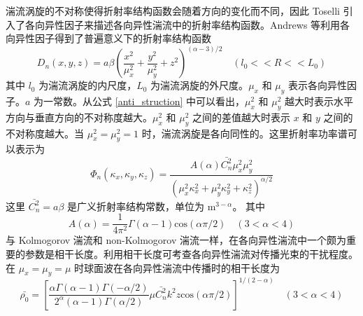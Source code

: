 \documentclass[master]{thesis-uestc}
\begin{document}
湍流涡旋的不对称使得折射率结构函数会随着方向的变化而不同，因此 Toselli 引入了各向异性因子来描述各向异性湍流中的折射率结构函数。Andrews 等利用各向异性因子得到了普遍意义下的折射率结构函数
\begin{equation}\label{anti_struction}
D_n(x,y,z)=a\beta\left(\frac{x^2}{\mu^2_x}+\frac{y^2}{\mu^2_y}+z^2\right)^{(\alpha-3)/2}\quad(l_{0}<<R<<L_0)
\end{equation}
\noindent 其中 $l_{0}$ 为湍流涡旋的内尺度，$L_{0}$ 为湍流涡旋的外尺度。$\mu_x$ 和 $\mu_y$ 表示各向异性因子。$a$ 为一常数。从公式 \eqref{anti_struction} 中可以看出，$\mu^2_x$ 和 $\mu^2_y$ 越大时表示水平方向与垂直方向的不对称度越大。$\mu^2_x$ 和 $\mu^2_y$ 之间的差值越大时表示 $x$ 和 $y$ 之间的不对称度越大。当 $\mu^2_x=\mu^2_y=1$ 时，湍流涡旋是各向同性的。这里折射率功率谱可以表示为
\begin{equation}\label{anti_power spectrum}
\Phi_{n}(\kappa_x,\kappa_y,\kappa_z)=\frac{A(\alpha)\bar{C^2_{n}}\mu^2_{x}\mu^2_y}{\left(\mu^2_x\kappa_x^2+\mu^2_y\kappa_y^2+\kappa_z^2\right)^{\alpha/2}}
\end{equation}
\noindent 这里 $\bar{C^2_{n}}=a\beta$ 是广义折射率结构常数，单位为 $\mathrm{m}^{3-\alpha}$。 其中
\begin{equation}\label{A}
A(\alpha)=\frac{1}{4\pi^2}\Gamma(\alpha-1)\mathrm{cos}(\alpha\pi/2)\quad(3<\alpha<4)
\end{equation}
\noindent 与 Kolmogorov 湍流和 non-Kolmogorov 湍流一样，在各向异性湍流中一个颇为重要的参数是相干长度。利用相干长度可考查各向异性湍流对传播光束的干扰程度。在 $\mu_x=\mu_y=\mu$ 时球面波在各向异性湍流中传播时的相干长度为
\begin{equation}\label{anti_coherence_radius}
  \bar{\rho_0}=\left[\frac{\alpha\Gamma(\alpha-1)\Gamma(-\alpha/2)}{2^{\alpha}(\alpha-1)\Gamma(\alpha/2)}\mu\bar{C^2_{n}}k^{2}z\mathrm{cos}(\alpha\pi/2)\right]^{1/(2-\alpha)}\quad(3<\alpha<4)
\end{equation}
\end{document}
